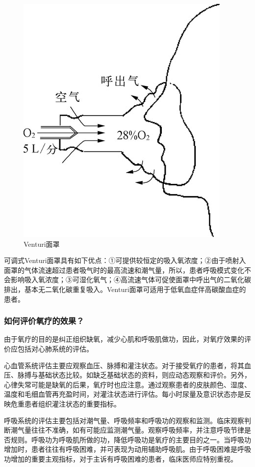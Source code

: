 \begin{figure}[!htbp]
 \centering
 \includegraphics{./images/Image00074.jpg}
 \captionsetup{justification=centering}
 \caption{Venturi面罩}
 \label{fig9-4}
  \end{figure} 

可调式Venturi面罩具有如下优点：①可提供较恒定的吸入氧浓度；②由于喷射入面罩的气体流速超过患者吸气时的最高流速和潮气量，所以，患者呼吸模式变化不会影响吸入氧浓度；③可湿化氧气；④高流速气体可促使面罩中呼出气的二氧化碳排出，基本无二氧化碳重复吸入。Venturi面罩可适用于低氧血症伴高碳酸血症的患者。

\subsubsection{如何评价氧疗的效果？}

由于氧疗的目的是纠正组织缺氧，减少心肌和呼吸肌做功，因此，对氧疗效果的评价应包括对心肺系统的评估。

心血管系统评估主要应观察血压、脉搏和灌注状态。对于接受氧疗的患者，将其血压、脉搏与基础状态比较。如缺乏基础状态的资料，则应动态观察和评价。另外，心律失常可能是缺氧的后果，氧疗时也应注意。通过观察患者的皮肤颜色、湿度、温度和毛细血管再充盈时间，对灌注状态进行评估。每小时尿量及意识状态亦是反映危重患者组织灌注状态的重要指标。

呼吸系统的评估主要包括对潮气量、呼吸频率和呼吸功的观察和监测。临床观察判断潮气量往往不准确，如有可能应监测潮气量。观察呼吸频率，并注意呼吸节律是否规则。呼吸功为呼吸肌所做的功，降低呼吸功是氧疗的主要目的之一。当呼吸功增加时，患者往往有呼吸困难，并可表现为动用辅助呼吸肌。由于呼吸困难是呼吸功增加的重要主观指标，对于主诉有呼吸困难的患者，临床医师应特别重视。

